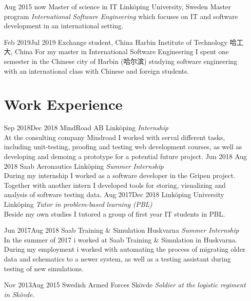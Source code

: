 \documentclass[]{k-cv} %
\begin{document}
\begin{entrylist}
\entry
{Aug 2015 \newline\to now}
{Master of science in IT}
{Linköping University, Sweden}
{Master program \emph{International Software Engineering} which focuses on IT and software development in an international setting.}

\entry
{Feb 2019\newline\to Jul 2019}
{Exchange student, China}
{Harbin Institute of Technology 哈工大, China}
{For my master in International Software Engineering I spent one semester in the
Chinese city of Harbin (哈尔滨) studying software engineering with an
international class with Chinese and foreign students.}
\end{entrylist}

\section{Work Experience}
\begin{entrylist}

\entry
{Sep 2018\newline \to Dec 2018}
{MindRoad AB}
{Linköping}
{\emph{Internship}\\ At the consulting company Mindroad I worked with serval different tasks,
including unit-testing, proofing and testing web development courses, as well as
developing and demoing a prototype for a potential future project.}
\entry
{Jun 2018 \newline\to Aug 2018}
{Saab Aeronautics}
{Linköping}
{\emph{Summer Internship} \\During my internship I worked as a software developer in the Gripen project. Together with another intern I developed tools for storing, visualizing and analysis of software testing data.}
\entry
{Aug 2017\newline\to Dec 2018}
{Linköping University}
{Linköping}
{\emph{Tutor in problem-based learning (PBL)} \\
Beside my own studies I tutored a group of first year IT students in PBL.}

\entry
{Jun 2017\newline\to Aug 2018}
{Saab Training \& Simulation}
{Huskvarna}
{\emph{Summer Internship} \\
In the summer of 2017 i worked at Saab Training \& Simulation in Huskvarna.
During my employment i worked with automating the process of migrating older
data and schematics to a newer system, as well as a testing assistant during
testing of new simulations.}

\entry
{Nov 2013\newline\to Aug 2015}
{Swedish Armed Forces}
{Skövde}
{\emph{Soldier at the logistic regiment in
Skövde.}}


\end{entrylist}
\clearpage
{}
\end{document}
